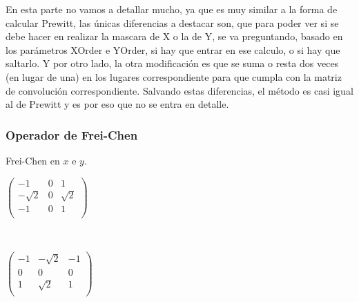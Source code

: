 En esta parte no vamos a detallar mucho, ya que es muy similar a la forma de calcular Prewitt, las únicas diferencias a destacar son, que para poder ver si se debe hacer en realizar la mascara de X o la de Y, se va preguntando, basado en los parámetros XOrder e YOrder, si hay que entrar en ese calculo, o si hay que saltarlo. Y por otro lado, la otra modificación es que se suma o resta dos veces (en lugar de una) en los lugares correspondiente para que cumpla con la matriz de convolución correspondiente. Salvando estas diferencias, el método es casi igual al de Prewitt y es por eso que no se entra en detalle.

\subsubsection{Operador de Frei-Chen}

Frei-Chen en $x$ e $y$.

\begin{center}
\begin{minipage}{0.30 \textwidth}
$\begin{pmatrix}
-1 & 0 & 1 \\
-\sqrt{2} & 0 & \sqrt{2} \\
-1 & 0 & 1 \\
\end{pmatrix}$
\end{minipage}
\ \ 
 \begin{minipage}{0.30 \textwidth}
$\begin{pmatrix}
-1 & -\sqrt{2} & -1 \\
0 & 0 & 0  \\
1 & \sqrt{2} & 1 \\
\end{pmatrix}$
\end{minipage}
\end{center}